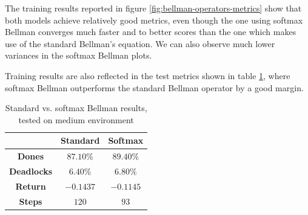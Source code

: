 \documentclass[a4paper,10pt]{report}
\begin{document}
The training results reported in figure \ref{fig:bellman-operators-metrics} show that both models achieve relatively good metrics, even though the one using softmax Bellman converges much faster and to better scores than the one which makes use of the standard Bellman's equation. We can also observe much lower variances in the softmax Bellman plots.

Training results are also reflected in the test metrics shown in table \ref{table:bellman-operators-res}, where softmax Bellman outperforms the standard Bellman operator by a good margin. 

\begin{table}[h]
	\center
	\begin{tabular}{|c|c|c|}
		\hline & \textbf{Standard} & \textbf{Softmax} \\ \hline
		\textbf{Dones}      & $87.10\%$ & $89.40\%$ \\ \hline
		\textbf{Deadlocks}  & $6.40\%$ & $6.80\%$ \\ \hline
		\textbf{Return}     & $-0.1437$ & $-0.1145$ \\ \hline
		\textbf{Steps}      & $120$ & $93$ \\ \hline
	\end{tabular}
	\caption{Standard vs. softmax Bellman results, tested on medium environment}
	\label{table:bellman-operators-res}
\end{table}
\end{document}
